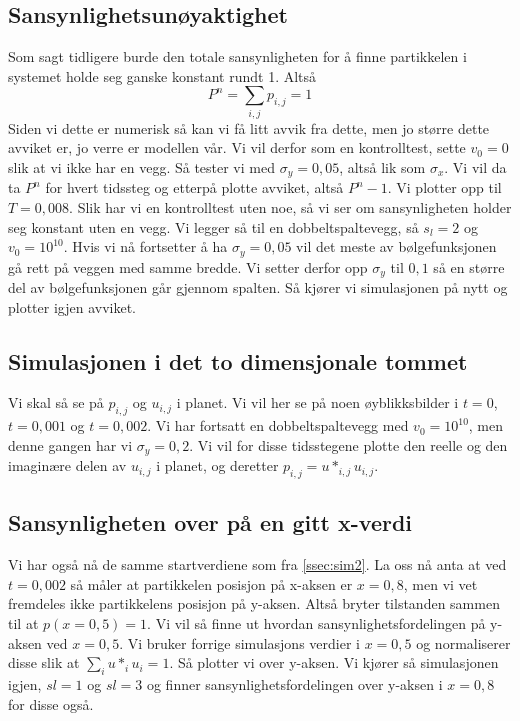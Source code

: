 \documentclass[reprint,english,notitlepage]{revtex4-2}  %
\begin{document}
\subsection{Sansynlighetsunøyaktighet}
Som sagt tidligere burde den totale sansynligheten for å finne partikkelen i systemet holde seg ganske konstant rundt 1. Altså
$$
P^n=\sum_{i,j}p_{i,j}=1
$$
Siden vi dette er numerisk så kan vi få litt avvik fra dette, men jo større dette avviket er, jo verre er modellen vår.  Vi vil derfor som en kontrolltest, sette $v_0=0$ slik at vi ikke har en vegg. Så tester vi med $\sigma_y=0,05$, altså lik som $\sigma_x$. Vi vil da ta $P^n$ for hvert tidssteg og etterpå plotte avviket, altså $P^n-1$. Vi plotter opp til $T=0,008$. Slik har vi en kontrolltest uten noe, så vi ser om sansynligheten holder seg konstant uten en vegg.
\newline Vi legger så til en dobbeltspaltevegg, så $s_l=2$ og $v_0=10^{10}$. Hvis vi nå fortsetter å ha $\sigma_y=0,05$ vil det meste av bølgefunksjonen gå rett på veggen med samme bredde. Vi setter derfor opp $\sigma_y$ til $0,1$ så en større del av bølgefunksjonen går gjennom spalten. Så kjører vi simulasjonen på nytt og plotter igjen avviket.
\subsection{Simulasjonen i det to dimensjonale tommet}\label{ssec:sim2}
Vi skal så se på $p_{i,j}$ og $u_{i,j}$ i planet. Vi vil her se på noen øyblikksbilder i $t=0$, $t=0,001$ og $t=0,002$. Vi har fortsatt en dobbeltspaltevegg med $v_0=10^{10}$, men denne gangen har vi $\sigma_y=0,2$.
Vi vil for disse tidsstegene plotte den reelle og den imaginære delen av $u_{i,j}$ i planet, og deretter $p_{i,j}=u*_{i,j}u_{i,j}$.
\subsection{Sansynligheten over på en gitt x-verdi}
Vi har også nå de samme startverdiene som fra \autoref{ssec:sim2}. La oss nå anta at ved $t=0,002$ så måler at partikkelen posisjon på x-aksen er $x=0,8$, men vi vet fremdeles ikke partikkelens posisjon på y-aksen. Altså bryter tilstanden sammen til at $p(x=0,5)=1$. Vi vil så finne ut hvordan sansynlighetsfordelingen på y-aksen ved $x=0,5$. Vi bruker forrige simulasjons verdier i $x=0,5$ og normaliserer disse slik at $\sum_{i}u*_iu_i=1$. Så plotter vi over y-aksen. Vi kjører så simulasjonen igjen, $sl=1$ og $sl=3$ og finner sansynlighetsfordelingen over y-aksen i $x=0,8$ for disse også. 
\end{document}

